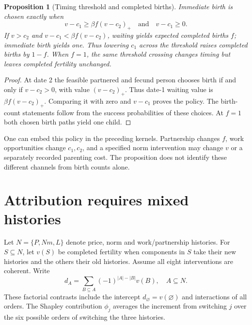 \documentclass[11pt]{article}
\newtheorem{proposition}[theorem]{Proposition}
\theoremstyle{remark}\newtheorem{remark}[theorem]{Remark}
\begin{document}
\begin{proposition}[Timing threshold and completed births]
Immediate birth is chosen exactly when
\[
 v-c_1\ge \beta f(v-c_2)_+ \quad\text{and}\quad v-c_1\ge0.
\]
If $v>c_2$ and $v-c_1<\beta f(v-c_2)$, waiting yields expected completed births $f$; immediate birth yields one. Thus lowering $c_1$ across the threshold raises completed births by $1-f$. When $f=1$, the same threshold crossing changes timing but leaves completed fertility unchanged.
\end{proposition}
\begin{proof}
At date 2 the feasible partnered and fecund person chooses birth if and only if $v-c_2>0$, with value $(v-c_2)_+$. Thus date-1 waiting value is $\beta f(v-c_2)_+$. Comparing it with zero and $v-c_1$ proves the policy. The birth-count statements follow from the success probabilities of these choices. At $f=1$ both chosen birth paths yield one child.
\end{proof}

One can embed this policy in the preceding kernels. Partnership changes $f$, work opportunities change $c_1,c_2$, and a specified norm intervention may change $v$ or a separately recorded parenting cost. The proposition does not identify these different channels from birth counts alone.

\section*{Attribution requires mixed histories}
Let $N=\{P,Nm,L\}$ denote price, norm and work/partnership histories. For $S\subseteq N$, let $v(S)$ be completed fertility when components in $S$ take their new histories and the others their old histories. Assume all eight interventions are coherent. Write
\[
 d_A=\sum_{B\subseteq A}(-1)^{|A|-|B|}v(B),\quad A\subseteq N.
\]
These factorial contrasts include the intercept $d_\varnothing=v(\varnothing)$ and interactions of all orders. The Shapley contribution $\phi_j$ averages the increment from switching $j$ over the six possible orders of switching the three histories.
\end{document}
